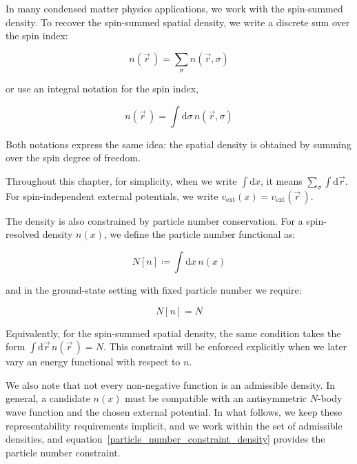 In many condensed matter physics applications, we work with the spin-summed density.
To recover the spin-summed spatial density, we write a discrete sum over the spin index:

\begin{equation}
    n(\vec{r}\,)=\sum_{\sigma} n(\vec{r},\sigma)
\label{sum_spatial_density}
\end{equation}

or use an integral notation for the spin index,

\begin{equation}
    n(\vec{r}\,)=\int\mathrm{d}\sigma\,n(\vec{r},\sigma)
\label{integral_spatial_density}
\end{equation}

Both notations express the same idea: the spatial density is obtained by summing over the spin degree of freedom.


Throughout this chapter, for simplicity, when we write $\int\mathrm{d}x$, it means $\sum_{\sigma}\int\mathrm{d}\vec{r}$.
For spin-independent external potentials, we write $v_\mathrm{ext}(x)=v_\mathrm{ext}(\vec{r}\,)$.

The density is also constrained by particle number conservation.
For a spin-resolved density $n(x)$, we define the particle number functional as:

\begin{equation}
    N[n]\coloneqq\int\mathrm{d}x\,n(x)
\label{particle_number_functional}
\end{equation}

and in the ground-state setting with fixed particle number we require:

\begin{equation}
    N[n]=N
\label{particle_number_constraint_density}
\end{equation}

Equivalently, for the spin-summed spatial density, the same condition takes the form $\int \mathrm{d}\vec{r}\,n(\vec{r}\,)=N$.
This constraint will be enforced explicitly when we later vary an energy functional with respect to $n$.

We also note that not every non-negative function is an admissible density.
In general, a candidate $n(x)$ must be compatible with an antisymmetric $N$-body wave function and the chosen external potential.
In what follows, we keep these representability requirements implicit,
and we work within the set of admissible densities, and equation~\eqref{particle_number_constraint_density} provides the particle number constraint.

